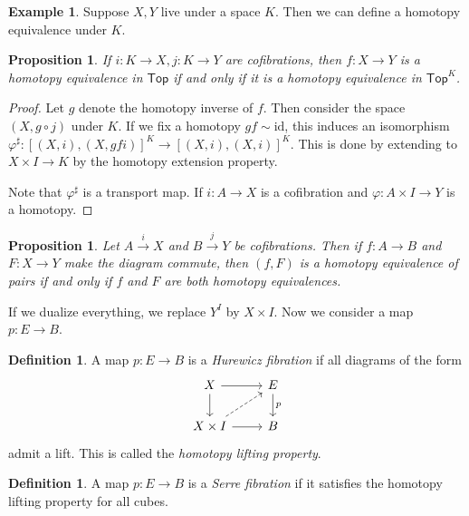 \documentclass[leqno, openany]{memoir}
\newtheorem{prop}[thm]{Proposition}
\theoremstyle{definition}
\newtheorem{defn}[thm]{Definition}
\newtheorem{exm}[thm]{Example}
\theoremstyle{remark}
\theoremstyle{plain}
\theoremstyle{definition}
\theoremstyle{remark}
\newcommand{\mr}[1]{\mathrm{#1}}
\newcommand{\ms}[1]{\mathsf{#1}}
\begin{document}
\begin{exm} Suppose $X,Y$ live under a space $K$. Then we can define a homotopy
equivalence under $K$.  \end{exm}

\begin{prop} If $i \colon K \to X,j \colon K \to Y$ are cofibrations, then $f
\colon X \to Y$ is a homotopy equivalence in $\ms{Top}$ if and only if it is a
homotopy equivalence in $\ms{Top}^K$.  \end{prop}

\begin{proof} Let $g$ denote the homotopy inverse of $f$. Then consider the
    space $(X, g \circ j)$ under $K$. If we fix a homotopy $gf \sim \mr{id}$,
    this induces an isomorphism $\varphi^{\sharp} \colon [(X,i), (X,gfi)]^K \to
    [(X,i), (X,i)]^K$. This is done by extending to $X \times I \to K$ by the
    homotopy extension property.

Note that $\varphi^{\sharp}$ is a transport map. If $i \colon A \to X$ is a
cofibration and $\varphi \colon A \times I \to Y$ is a homotopy.  \end{proof}

\begin{prop} Let $A \xrightarrow{i} X$ and $B \xrightarrow{j} Y$ be
    cofibrations. Then if $f \colon A \to B$ and $F \colon X \to Y$ make the
    diagram commute, then $(f, F)$ is a homotopy equivalence of pairs if and
    only if $f$ and $F$ are both homotopy equivalences.  \end{prop}

If we dualize everything, we replace $Y^I$ by $X \times I$. Now we consider a
map $p \colon E \to B$.

\begin{defn} A map $p \colon E \to B$ is a \textit{Hurewicz fibration} if all
    diagrams of the form \begin{equation} \begin{tikzcd} X \arrow{r} \arrow{d}
    & E \arrow{d}{p} \\ X \times I \arrow{r} \arrow[dashrightarrow]{ur} & B
    \end{tikzcd} \end{equation} admit a lift. This is called the
\textit{homotopy lifting property}.  \end{defn}

\begin{defn} A map $p \colon E \to B$ is a \textit{Serre fibration} if it
satisfies the homotopy lifting property for all cubes.  \end{defn}
\end{document}
